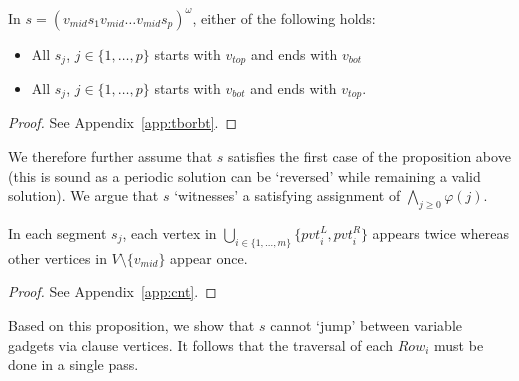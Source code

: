 \documentclass[envcountsame]{llncs}
\begin{document}
\begin{proposition}\label{prop:tborbt}
In $s = (v_{mid} s_1 v_{mid} \ldots v_{mid} s_p)^\omega$, either of the following holds:
\begin{itemize}
\item All $s_j$, $j \in \{ 1, \ldots, p \}$ starts with $v_{top}$ and ends with $v_{bot}$
\item All $s_j$, $j \in \{ 1, \ldots, p \}$ starts with $v_{bot}$ and ends with $v_{top}$.
\end{itemize}
\end{proposition}
\begin{proof}
See Appendix~\ref{app:tborbt}.
\end{proof}
We therefore further assume that $s$ satisfies the first case of the proposition above
(this is sound as a periodic solution can be `reversed' while remaining a valid solution).
We argue that $s$ `witnesses' a satisfying assignment of $\bigwedge_{j \geq 0} \varphi(j)$.
\begin{proposition}\label{prop:exact}
In each segment $s_j$, each vertex in \( \bigcup_{i \in \{1, \ldots, m\}} \{\mathit{pvt}_i^L, \mathit{pvt}_i^R\} \) appears twice
whereas other vertices in $V \setminus \{ v_{mid} \}$ appear once.
\end{proposition}
\begin{proof}
See Appendix~\ref{app:cnt}.
\end{proof}
Based on this proposition, we show that $s$ cannot `jump' between variable gadgets via clause vertices.
It follows that the traversal of each $\mathit{Row}_i$ must be done in a single pass.
\end{document}

